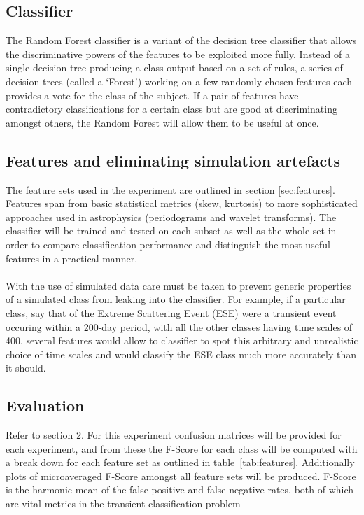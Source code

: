 \documentclass[10pt]{report}
\begin{document}
	\subsection{Classifier}
	The Random Forest classifier is a variant of the decision tree classifier that allows the discriminative powers of the features to be exploited more fully. Instead of a single decision tree producing a class output based on a set of rules, a series of decision trees (called a `Forest') working on a few randomly chosen features each provides a vote for the class of the subject. If a pair of features have contradictory classifications for a certain class but are good at discriminating amongst others, the Random Forest will allow them to be useful at once. \\ %
	
	\subsection{Features and eliminating simulation artefacts}
	The feature sets used in the experiment are outlined in section \ref{sec:features}. Features span from basic statistical metrics (skew, kurtosis) to more sophisticated approaches used in astrophysics (periodograms and wavelet transforms). The classifier will be trained and tested on each subset as well as the whole set in order to compare classification performance and distinguish the most useful features in a practical manner. \\ \\
	With the use of simulated data care must be taken to prevent generic properties of a simulated class from leaking into the classifier. For example, if a particular class, say that of the Extreme Scattering Event (ESE) were a transient event occuring within a 200-day period, with all the other classes having time scales of 400, several features would allow to classifier to spot this arbitrary and unrealistic choice of time scales and would classify the ESE class much more accurately than it should. 
	
	\subsection{Evaluation}
	Refer to section 2. For this experiment confusion matrices will be provided for each experiment, and from these the F-Score for each class will be computed with a break down for each feature set as outlined in table~\ref{tab:features}. Additionally plots of microaveraged F-Score amongst all feature sets will be produced. F-Score is the harmonic mean of the false positive and false negative rates, both of which are vital metrics in the transient classification problem
	
\end{document}
